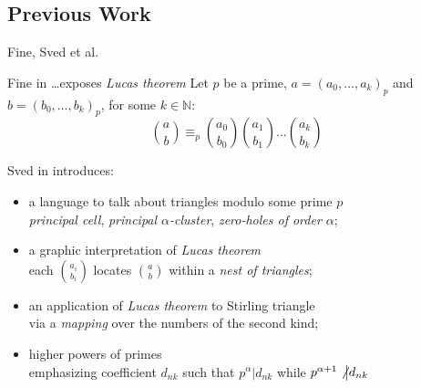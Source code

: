 \documentclass[10pt,serif, professionalfont]{beamer}
\begin{document}
\subsection{Previous Work}

\begin{frame}{Fine, Sved et al.}

    \begin{block}{Fine in \ldots exposes \emph{Lucas theorem}}
        Let $p$ be a prime, $a=(a_{0},\ldots,a_{k})_{p}$ and $b=(b_{0},\ldots,b_{k})_{p}$, for some $k\in\mathbb{N}$:
        \begin{displaymath}
            {{a}\choose{b}} \equiv_{p} {{a_{0}}\choose{b_{0}}}{{a_{1}}\choose{b_{1}}}
                \ldots{{a_{k}}\choose{b_{k}}}
        \end{displaymath}
    \end{block}
    \pause
    \begin{block}{Sved in \cite{Sved1998} introduces:}
        \begin{itemize}
            \item {\normalsize a language to talk about triangles modulo some prime $p$}\\
                \footnotesize{\emph{principal cell}, \emph{principal $\alpha$-cluster}, \emph{zero-holes of order $\alpha$}};
            \item {\normalsize a graphic interpretation of \emph{Lucas theorem} }\\
                \footnotesize{each ${{a_i}\choose{b_i}}$ locates ${{a}\choose{b}}$ within a \emph{nest of triangles}};
            \item {\normalsize an application of \emph{Lucas theorem} to Stirling triangle}\\
                \footnotesize{via a \emph{mapping} over the numbers of the second kind};
            \item {\normalsize higher powers of primes}\\
                \footnotesize{emphasizing coefficient $d_{nk}$ such that 
                    $p^{\alpha}\big|d_{nk}$ while $p^{\alpha+1}\not\big|d_{nk}$}
        \end{itemize}
    \end{block}
\end{frame}
\end{document}
